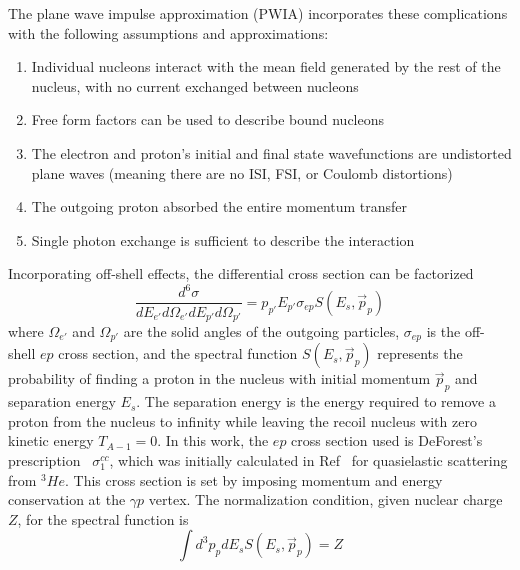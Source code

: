 The plane wave impulse approximation (PWIA) incorporates these complications
with the following assumptions and approximations:
\begin{enumerate}
    \item Individual nucleons interact with the mean field generated by the rest
        of the nucleus, with no current exchanged between nucleons
    \item Free form factors can be used to describe bound nucleons
    \item The electron and proton's initial and final state wavefunctions are
        undistorted plane waves (meaning there are no ISI, FSI, or Coulomb
        distortions)
    \item The outgoing proton absorbed the entire momentum transfer
    \item Single photon exchange is sufficient to describe the interaction
\end{enumerate}

Incorporating off-shell effects, the differential cross section can be
factorized~\cite{Dieperink_1975, DeForest_1983, Frullani_1984}
\begin{equation}
    \frac{d^6 \sigma}{dE_{e'} d\Omega_{e'} dE_{p'} d\Omega_{p'}} = p_{p'} E_{p'} \sigma_{ep} S(E_s, \vec{p}_p)
\end{equation}
where $\Omega_{e'}$ and $\Omega_{p'}$ are the solid angles of the outgoing particles,
$\sigma_{ep}$ is the off-shell $ep$ cross section,
and the spectral function $S(E_s, \vec{p}_p)$ represents the probability of
finding a proton in the nucleus with initial momentum $\vec{p}_p$ and
separation energy $E_s$.
The separation energy is the energy required to remove a proton from the nucleus
to infinity while leaving the recoil nucleus with zero kinetic energy
$T_{A-1}=0$.
In this work, the $ep$ cross section used is DeForest's
prescription~\cite{DeForest_1983} $\sigma^{cc}_1$,
which was initially calculated in Ref~\cite{Dieperink_1976} for quasielastic
scattering from ${}^3He$.
This cross section is set by imposing momentum and energy conservation at the
$\gamma p$ vertex.
The normalization condition, given nuclear charge $Z$, for the spectral
function is
\begin{equation}
\int d^3p_p dE_s S(E_s, \vec{p}_p) = Z
\end{equation}
